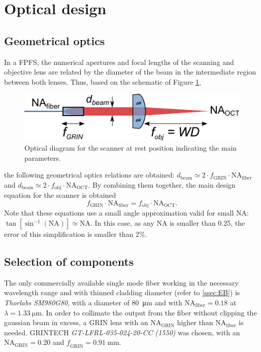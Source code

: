\documentclass[10pt]{iopart}
\begin{document}
\section{Optical design}

\subsection{Geometrical optics}
In a FPFS, the numerical apertures and focal lengths of the scanning and objective lens are related by the diameter of the beam in the intermediate region between both lenses. Thus, based on the schematic of Figure \ref{fig:opticsParam}, 
\begin{figure}[h]\centering
      \includegraphics{figures/opticsParam.pdf}
      \caption{Optical diagram for the scanner at rest position indicating the main parameters.}
      \label{fig:opticsParam}
\end{figure}
the following geometrical optics relations are obtained: $d_\mathrm{beam} \simeq 2\cdot f_\mathrm{GRIN}\cdot \mathrm{NA}_\mathrm{fiber}$ and $d_\mathrm{beam} \simeq 2 \cdot f_\mathrm{obj}\cdot \mathrm{NA}_\mathrm{OCT}$. By combining them together, the main design equation for the scanner is obtained
\begin{equation}
f_\mathrm{GRIN} \cdot \mathrm{NA}_\mathrm{fiber} = f_\mathrm{obj} \cdot \mathrm{NA}_\mathrm{OCT}.
\label{eq:fpsNA}
\end{equation} Note that these equations use a small angle approximation valid for small NA:  $\tan[\sin^{-1}(\mathrm{NA})] \simeq \mathrm{NA} $. In this case, as any NA is smaller than 0.25, the error of this simplification is smaller than 2\%.

\subsection{Selection of components}
The only commercially available single mode fiber working in the necessary wavelength range and with thinned cladding diameter (refer to \autoref{ssec:EB}) is \textit{Thorlabs SM980G80}, with a diameter of \SI{80}{\micro\meter} and with $\mathrm{NA_\mathrm{fiber}} = 0.18$ at $\lambda = \SI{1.33}{\micro\meter}$. In order to collimate the output from the fiber without clipping the gaussian beam in excess, a GRIN lens with an $\mathrm{NA_{GRIN}}$ higher than $\mathrm{NA_{fiber}}$ is needed. GRINTECH \textit{GT-LFRL-035-024-20-CC (1550)} was chosen, with an $\mathrm{NA_\mathrm{GRIN}} = 0.20$ and $\mathit{f_\mathrm{GRIN}} = \SI{0.91}{\milli\meter}$. 
\end{document}
